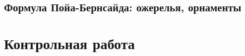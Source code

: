 \documentclass[10pt, twoside]{article}
\begin{document}
\subsection{Формула Пойа-Бернсайда: ожерелья, орнаменты}
% 
% 

\newpage
{}
\section*{Контрольная работа}
% 
\end{document}
